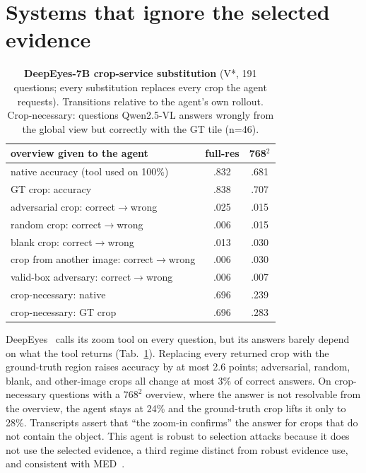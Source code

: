 \documentclass[10pt,twocolumn,letterpaper]{article}
\begin{document}
\section{Systems that ignore the selected evidence}
\begin{table}[t]\centering\small
\caption{\textbf{DeepEyes-7B crop-service substitution} (V*, 191 questions; every substitution replaces every crop the agent requests). Transitions relative to the agent's own rollout. Crop-necessary: questions Qwen2.5-VL answers wrongly from the global view but correctly with the GT tile (n=46).}\label{tab:deepeyes}
\setlength{\tabcolsep}{3pt}
\begin{tabular}{@{}lcc@{}}\toprule
overview given to the agent & full-res & 768$^2$\\\midrule
native accuracy (tool used on 100\%) & .832 & .681\\
GT crop: accuracy & .838 & .707\\
adversarial crop: correct$\to$wrong & .025 & .015\\
random crop: correct$\to$wrong & .006 & .015\\
blank crop: correct$\to$wrong & .013 & .030\\
crop from another image: correct$\to$wrong & .006 & .030\\
valid-box adversary: correct$\to$wrong & .006 & .007\\\midrule
crop-necessary: native & .696 & .239\\
crop-necessary: GT crop & .696 & .283\\\bottomrule
\end{tabular}\end{table}

DeepEyes~\cite{zheng2025deepeyes} calls its zoom tool on every question, but its answers barely depend on what the tool returns (Tab.~\ref{tab:deepeyes}). Replacing every returned crop with the ground-truth region raises accuracy by at most 2.6 points; adversarial, random, blank, and other-image crops all change at most 3\% of correct answers. On crop-necessary questions with a $768^2$ overview, where the answer is not resolvable from the overview, the agent stays at 24\% and the ground-truth crop lifts it only to 28\%. Transcripts assert that ``the zoom-in confirms'' the answer for crops that do not contain the object. This agent is robust to selection attacks because it does not use the selected evidence, a third regime distinct from robust evidence use, and consistent with MED~\cite{med2026}.
\end{document}
